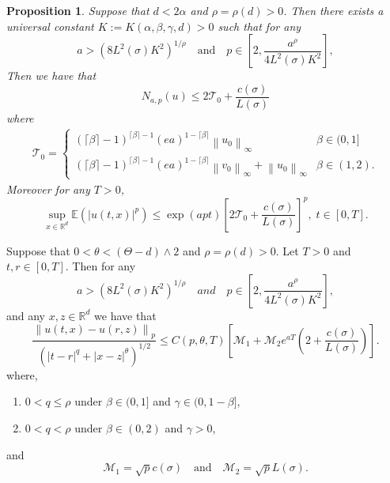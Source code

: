 \documentclass{beamer}%
\newtheorem{proposition}{Proposition}
\numberwithin{equation}{section}
\newcommand{\R}{\mathbb{R}}
\newcommand{\Norm}[1]{\left\|  #1   \right\|}
\begin{document}
	
	\begin{frame}
	\begin{proposition}
Suppose that $d < 2 \alpha$ and $\rho = \rho(d) > 0$. Then there exists a universal constant $K:=K(\alpha, \beta, \gamma,d) >0$ such that for any 
	\[
	a > \left( 8 L^2(\sigma)K^2\right)^{1/\rho} \quad \text{and} \quad p \in \left[ 2, \frac{a^{\rho}}{4L^2(\sigma)K^2} \right],
	\]
	Then we have that 
	\begin{equation}
	\label{E:Nbdd}
	N_{a,p}(u)  \le 2 \mathcal{T}_0 +  \frac{c(\sigma)}{L(\sigma)}
	\end{equation}	
	where
	\begin{align*}
	\mathcal{T}_0 = \begin{cases} 
	(\lceil \beta \rceil - 1)^{\lceil \beta \rceil -1}(ea)^{1-\lceil \beta \rceil} \Norm{u_0}_\infty  & \beta \in (0,1]
	\\ (\lceil \beta \rceil - 1)^{\lceil \beta \rceil -1}(ea)^{1-\lceil \beta \rceil} \Norm{v_0}_\infty + \Norm{u_0}_\infty & \beta \in (1,2).
	\end{cases} 
	\end{align*}
	Moreover for any $T>0$,
	\begin{equation}
	\label{E:Pnormtbdd}
	\sup_{x\in\R^d} \mathbb{E}(|u(t,x)|^p) \le \exp\left( a p t  \right) \left[ 2 \mathcal{T}_0 + \frac{ c(\sigma) }{L(\sigma)} \right]^p, \; t\in[0,T].
	\end{equation}
\end{proposition}
	\end{frame}

	\begin{frame}
Suppose that $0< \theta < (\Theta -d) \wedge 2$ and $\rho = \rho(d) > 0$. Let $T>0$ and $t,r \in [0,T]$. Then for any
\[
a > \left( 8 L^2(\sigma)K^2\right)^{1/
	\rho} \quad {and} \quad p \in \left[ 2, \frac{a^{\rho}}{4L^2(\sigma)K^2} \right],
\]
and any $x,z \in \R^d$ we have that
\begin{equation}
\label{E:NormInc_cL}
\frac{\Norm{u(t,x)-u(r,z)}_p}{\left(|t-r|^{q} + |x-z|^{\theta}\right)^{1/2}} \le C(p,\theta, T)\left[ \mathcal{M}_1 + \mathcal{M}_2 e^{aT} \left( 2 +  \frac{c(\sigma)}{L(\sigma)} \right)\right].
\end{equation}
where,
	\begin{enumerate}
	\item $0< q \le \rho$ under $\beta \in (0,1]$ and $\gamma \in (0, 1-\beta]$,
	\item $0 < q < \rho$ under $\beta \in (0,2)$ and $\gamma >0$,
\end{enumerate}
and 
	\[
		\mathcal{M}_1 = \sqrt{p}c(\sigma) \quad \text{and} \quad\mathcal{M}_2 =\sqrt{p}L(\sigma).
	\]
	\end{frame}
\end{document}
